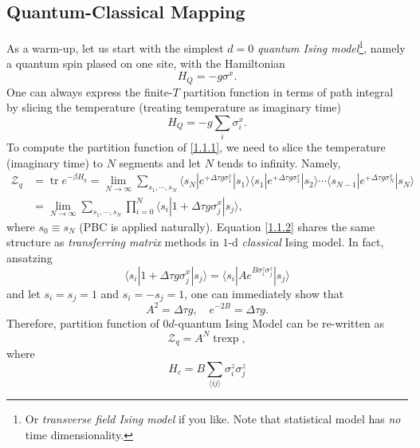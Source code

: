 \documentclass[10pt,nofootinbib]{revtex4}
\newcounter{Note}[section]
\numberwithin{equation}{section}
\begin{document}
	\subsection{Quantum-Classical Mapping}
		As a warm-up, let us start with the simplest $d=0$ \emph{quantum Ising model}\footnote{Or \emph{transverse field Ising model} if you like. Note that statistical model has \emph{no} time dimensionality.}, namely a quantum spin plased on one site, with the Hamiltonian
		\begin{equation}\label{1.1.1}
			H_{Q}=-g\sigma^x.
		\end{equation}
		One can always express the finite-$T$ partition function in terms of path integral by slicing the temperature (treating temperature as imaginary time) 
		\begin{equation}\label{1.1.1}
			H_{Q}=-g\sum_i\sigma_i^x.
		\end{equation}
		To compute the partition function of \eqref{1.1.1}, we need to slice the temperature (imaginary time) to $N$ segments and let $N$ tends to infinity. Namely,
		\begin{align}\label{1.1.2}
			\mathcal{Z}_{q}&=\mathop{\mathrm{tr}}e^{-\beta H_q}=\lim_{N\rightarrow\infty}\sum_{s_1,\cdots,s_N}\langle s_N|e^{+\Delta\tau g\sigma^x_1}|s_1\rangle \langle s_1|e^{+\Delta\tau g\sigma_2^x}|s_2\rangle\cdots \langle s_{N-1}|e^{+\Delta\tau g\sigma^x_N}|s_N\rangle\nonumber\\
			&=\lim_{N\rightarrow\infty}\sum_{s_1,\cdots,s_N}\prod_{i=0}^N\langle s_i|1+\Delta\tau g\sigma_j^x|s_j\rangle,
		\end{align}
		where $s_0\equiv s_N$ (PBC is applied naturally). Equation \eqref{1.1.2} shares the same structure as \emph{transferring matrix} methods in $1$-d \emph{classical} Ising model. In fact, ansatzing
		\begin{equation*}
			\langle s_i|1+\Delta\tau g\sigma_j^x|s_j\rangle= \langle s_i|Ae^{B\sigma_i^z\sigma_j^z}|s_j\rangle
		\end{equation*}
		and let $s_i=s_j=1$ and $s_i=-s_j=1$, one can immediately show that
		\begin{equation}\label{1.1.3}
			A^2=\Delta \tau g,\quad e^{-2B}=\Delta\tau g.
		\end{equation}
		Therefore, partition function of $0d$-quantum Ising Model can be re-written as
		\begin{equation}\label{1.1.4}
			\mathcal{Z}_{q}=A^N\mathop{\mathrm{tr}\exp \left(-\beta H_{c}\right) },
		\end{equation}
		where
		\begin{equation}\label{1.1.5}
			H_{c}=B\sum_{\langle ij\rangle}\sigma_i^z\sigma_j^z
		\end{equation}
\end{document}
